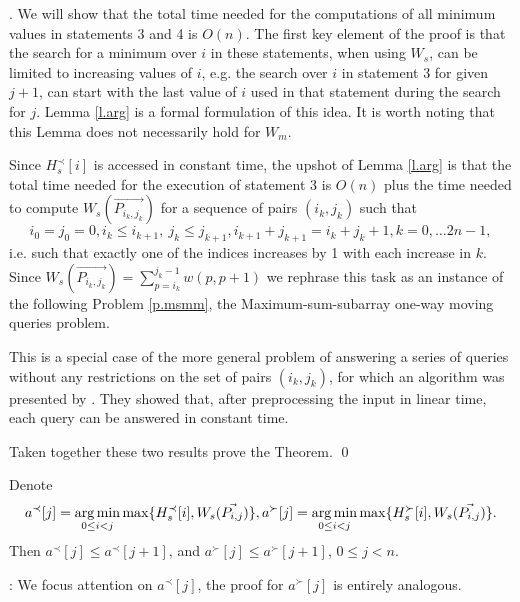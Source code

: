 .
We will show that the total time needed for the computations of all minimum values in statements 3 and 4 is $O(n)$.
The first key element of the proof is that the search for a minimum over $i$ 
in these statements, when using $W_s$, can be limited to increasing values of $i$, e.g. the search over $i$ in statement 3
for given $j+1$, can start with the last value of $i$ used in that statement during the 
search for $j$. Lemma \ref{l.arg} is a formal formulation of this idea.
It is worth noting that this Lemma does not necessarily hold for $W_m$.

Since $H_s^{\prec}[i]$ is accessed in constant time, the upshot of Lemma \ref{l.arg} 
is that the total time needed for the execution of statement 3 is $O(n)$ plus
the time needed to compute  $W_s(\vec{P_{i_k, j_k}})$ for a sequence  of pairs $(i_k,j_k)$ 
such that 
$$i_0=j_0=0, i_k\leq  i_{k+1},\  j_k \leq j_{k+1}, 
i_{k+1}+j_{k+1}=i_k+j_k+1,
k=0, \ldots 2n-1,$$
i.e. such that exactly one of the indices increases by 1 with each increase in $k$.
Since $W_s(\vec{P_{i_k, j_k}})=\sum_{p=i_k}^{j_k-1} w(p,p+1)$ we rephrase
this task as an instance of the following Problem \ref{p.msmm}, the Maximum-sum-subarray one-way moving queries problem.

This is a special case of the more general problem of answering a series of queries without any restrictions on the set of pairs $(i_k,j_k)$, for which an algorithm was
 presented by \cite{chen2004}. They showed
that, after preprocessing the input
in linear time, each query can be answered in constant time.

Taken together these two results prove the Theorem.
\qed

\begin{lemma}\label{l.arg}
	Denote 
	$$a^{\prec}[j]=\operatorname*{arg\,min}_{0\leq i <j} \max \{ H_s^{\prec}[i], W_s(\vec{P_{i, j}}) \},
	a^{\succ}[j]=\operatorname*{arg\,min}_{0\leq i <j} \max \{ H_s^{\succ}[i], W_s(\vec{P_{i, j}}) \}.
	$$
	Then $a^{\prec}[j]\leq a^{\prec}[j+1]$, and $a^{\succ}[j]\leq a^{\succ}[j+1]$, $0\leq j <n$.
\end{lemma}

: We focus attention on $a^{\prec}[j]$, the proof for $a^{\succ}[j]$ 
is entirely analogous.

